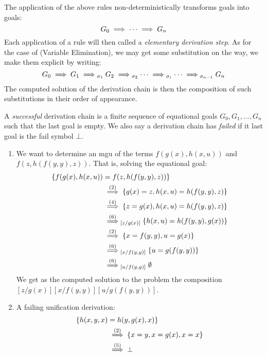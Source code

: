 The application of the above rules non-deterministically transforms goals into goals:
$$G_0 \mathrel{\implies} \cdots \mathrel{\implies} G_n$$
Each application of a rule will then called a \textit{elementary derivation step}. As for the case of (Variable Elimination), we may get some substitution on the way, we make them explicit by writing:
$$G_0 \mathrel{\implies} G_1 \mathrel{\implies}_{\sigma_1} G_2 \mathrel{\implies}_{\sigma_2} \cdots \mathrel{\implies}_{\sigma_i} \cdots \mathrel{\implies}_{\sigma_{n-1}} G_n$$
The computed solution of the derivation chain is then the composition of such substitutions in their order of appearance.

\begin{definition}
	A \textit{successful} derivation chain is a finite sequence of equational goals $G_0,G_1,\dots,G_n$ such that the last goal is empty. We also say a derivation chain has \textit{failed} if it last goal is the fail symbol $\bot$.
\end{definition}

\begin{example}\label{example:unif-examples}
	\begin{enumerate}
		\item We want to determine an mgu of the terms $f(g(x),h(x,u))$ and $f(z,h(f(y,y),z))$. That is, solving the equational goal:
		      \begin{align*}
			      \{ f(g(x),h(x,u)) & = f(z,h(f(y,y),z)) \}                                           \\
			                        & \overset{(2)}{\mathrel{\implies}} \{g(x) = z, h(x,u) = h(f(y,y),z)\}     \\
			                        & \overset{(4)}{\mathrel{\implies}} \{z = g(x), h(x,u) = h(f(y,y),z)\}     \\
			                        & \overset{(6)}{\mathrel{\implies}}_{[z/g(x)]} \{h(x,u) = h(f(y,y),g(x))\} \\
			                        & \overset{(2)}{\mathrel{\implies}} \{x = f(y,y), u = g(x) \}              \\
			                        & \overset{(6)}{\mathrel{\implies}}_{[x/f(y,y)]} \{ u = g(f(y,y)) \}       \\
			                        & \overset{(6)}{\mathrel{\implies}}_{[u/f(y,y)]} \emptyset
		      \end{align*}
		      We get as the computed solution to the problem the composition $[z/g(x)][x/f(y,y)][u/g(f(y,y))]$.

		\item A failing unification derivation:
		      \begin{align*}
			      \{ h(x,y,x) & = h(y,g(x),x)\}                                     \\
			                  & \overset{(2)}{\mathrel{\implies}} \{x = y, x = g(x), x = x\} \\
			                  & \overset{(5)}{\mathrel{\implies}} \bot
		      \end{align*}
	\end{enumerate}
\end{example}

